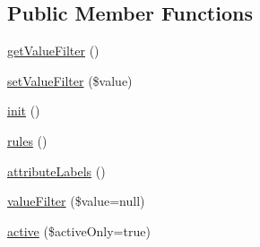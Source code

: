 \subsection*{Public Member Functions}
\begin{DoxyCompactItemize}
\item 
\hyperlink{classCPSCodeTableModel_ac14f301a6e13de3cf9bf32919ba44278}{getValueFilter} ()
\item 
\hyperlink{classCPSCodeTableModel_a5e3b07abe66ebd7c4d3f8c7188f7f8ae}{setValueFilter} (\$value)
\item 
\hyperlink{classCPSCodeTableModel_a4be4055f3361d4800e16bc2e2e38cda6}{init} ()
\item 
\hyperlink{classCPSCodeTableModel_a17dba92d96b9dd48c62f3ede3eef94d4}{rules} ()
\item 
\hyperlink{classCPSCodeTableModel_aae54d2938df6eac42a9a9020a64ae31b}{attributeLabels} ()
\item 
\hyperlink{classCPSCodeTableModel_aaf9f826b33b46930ea53b641e13825c0}{valueFilter} (\$value=null)
\item 
\hyperlink{classCPSCodeTableModel_ad430bec277cab9f4c60f3a6ea402adbc}{active} (\$activeOnly=true)
\end{DoxyCompactItemize}
